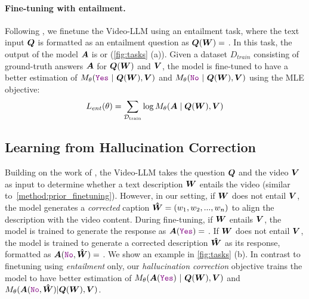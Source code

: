 \paragraph{Fine-tuning with entailment.}
\label{method:prior_finetuning}
Following \citet{bansal2024videocon}, we finetune the Video-LLM using an entailment task, where
the text input $\boldsymbol{Q}$ is formatted as an entailment question %
as $\boldsymbol{Q}(\boldsymbol{W}) =$ .
In this task, the output of the model $\boldsymbol{A}$ is  or  (\autoref{fig:tasks} (a)).
Given a dataset $D_{train}$ consisting of ground-truth answers $\boldsymbol{A}$ for $\boldsymbol{Q}(\boldsymbol{W})$ and $\boldsymbol{V}$, the model is fine-tuned to have a better estimation of $M_\theta(\textcolor{violet}{\texttt{Yes}} ~|~ \boldsymbol{Q}(\boldsymbol{W}), \boldsymbol{V}) $ and $M_{\theta}(\textcolor{violet}{\texttt{No}} ~|~ \boldsymbol{Q}(\boldsymbol{W}), \boldsymbol{V})$ using the MLE objective:
\begin{equation}
 L_{ent}(\theta) = \sum_ {\mathcal{D}_{\textrm{train}}}   \log M_{\theta} (\boldsymbol{A} \mid \boldsymbol{Q}(\boldsymbol{W}), \boldsymbol{V})
 \label{equation:entail_training}
\end{equation}


\subsection{Learning from Hallucination Correction}
\label{sec:hallucination_correction}

Building on the work of \citet{bansal2024videocon}, the Video-LLM takes the question $\boldsymbol{Q}$ and the video $\boldsymbol{V}$ as input to determine whether a text description $\boldsymbol{W}$ entails the video (similar to~\autoref{method:prior_finetuning}). 
However, in our setting, if $\boldsymbol{W}$ does not entail $\boldsymbol{V}$, the model generates a \textit{corrected} caption $\boldsymbol{\hat{W}}=(w_1, w_2, ..., w_n)$ to align the description with the video content.
During fine-tuning, if $\boldsymbol{W}$ entails $\boldsymbol{V}$, the model is trained to generate the response as
$\boldsymbol{A}(\textcolor{violet}{\texttt{Yes}}) =$ .
If $\boldsymbol{W}$ does not entail $\boldsymbol{V}$, the model is trained to generate a corrected description $\boldsymbol{\hat{W}}$ as its response, formatted as
$\boldsymbol{A}(\textcolor{violet}{\texttt{No}}, \boldsymbol{\hat{W}}) =$ .
We show an example in \autoref{fig:tasks} (b). In contrast to finetuning using \textit{entailment} only, 
our \textit{hallucination correction} objective trains the model 
to have better estimation of $M_\theta(\boldsymbol{A}(\textcolor{violet}{\texttt{Yes}}) ~|~ \boldsymbol{Q}(\boldsymbol{W}), \boldsymbol{V}) $ and $M_\theta(\boldsymbol{A}(\textcolor{violet}{\texttt{No}}, \boldsymbol{\hat{W}}) | \boldsymbol{Q}(\boldsymbol{W}), \boldsymbol{V}) $.

